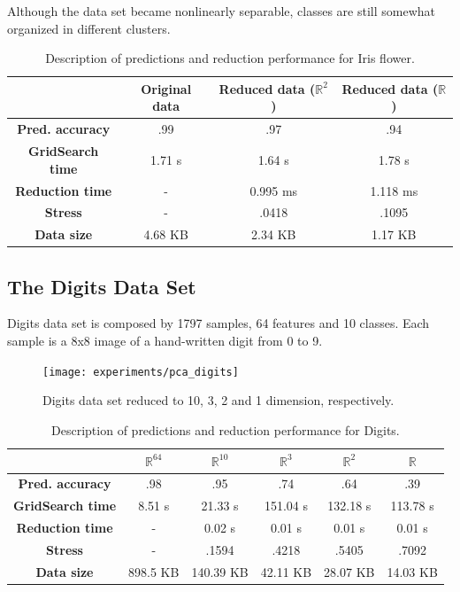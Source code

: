 Although the data set became nonlinearly separable, classes are still somewhat organized in different clusters.

\begin{table}[H]
	\centering
	
	\begin{tabular}{|c|c|c|c|}
		\hline
		& \textbf{Original data} & \textbf{Reduced data ($\mathbb{R}^2$)} & \textbf{Reduced data ($\mathbb{R}$)} \\\hline
		\textbf{Pred. accuracy} & .99 & .97 & .94 \\\hline
		\textbf{GridSearch time} & 1.71 s & 1.64 s & 1.78 s \\\hline
		\textbf{Reduction time} & - & 0.995 ms & 1.118 ms \\\hline
		\textbf{Stress} & - & .0418 & .1095 \\\hline
		\textbf{Data size} & 4.68 KB & 2.34 KB & 1.17 KB \\\hline
	\end{tabular}
	
	\caption{Description of predictions and reduction performance for Iris flower.}
\end{table}

\clearpage
\subsection{The Digits Data Set}

Digits data set is composed by 1797 samples, 64 features and 10 classes. Each sample is a 8x8 image of a hand-written digit from 0 to 9.

\begin{figure}[H]
	\centering
	\captionsetup{justification=centering}
	\texttt{[image: experiments/pca\_digits]}
	\caption{Digits data set reduced to 10, 3, 2 and 1 dimension, respectively.}
	\label{fig:dsdigitspca}
\end{figure}

\begin{table}[H]
	\centering
	\begin{tabular}{|c|c|c|c|c|c|}
		\hline
		& \textbf{$\mathbb{R}^{64}$} & \textbf{$\mathbb{R}^{10}$} & \textbf{$\mathbb{R}^3$} & \textbf{$\mathbb{R}^2$} & \textbf{$\mathbb{R}$} \\\hline
		\textbf{Pred. accuracy}   & .98 & .95 & .74 & .64 & .39 \\\hline
		\textbf{GridSearch time} & 8.51 s & 21.33 s & 151.04 s & 132.18 s & 113.78 s \\\hline
		\textbf{Reduction time} & - & 0.02 s & 0.01 s & 0.01 s & 0.01 s \\\hline
		\textbf{Stress} & - & .1594 & .4218 & .5405 & .7092 \\\hline
		\textbf{Data size} & 898.5 KB & 140.39 KB & 42.11 KB & 28.07 KB & 14.03 KB \\\hline
	\end{tabular}
	
	\caption{Description of predictions and reduction performance for Digits.}
\end{table}

